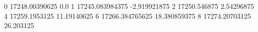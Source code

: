 0 17248.00390625 0.0
1 17245.083984375 -2.919921875
2 17250.546875 2.54296875
4 17259.1953125 11.19140625
6 17266.384765625 18.380859375
8 17274.20703125 26.203125
